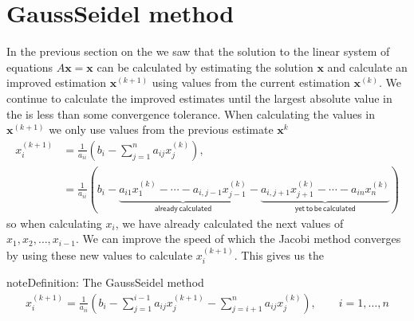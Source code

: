 \documentclass[letterpaper,10pt,english]{jupyterBook}
\begin{document}
\section{Gauss\sphinxhyphen{}Seidel method}
\label{\detokenize{7_Indirect_methods/7.2_Gauss_Seidel_method:gauss-seidel-method}}\label{\detokenize{7_Indirect_methods/7.2_Gauss_Seidel_method:gauss-seidel-method-section}}\label{\detokenize{7_Indirect_methods/7.2_Gauss_Seidel_method::doc}}
\sphinxAtStartPar
In the previous section on the {\hyperref[\detokenize{7_Indirect_methods/7.1_Jacobi_method:jacobi-method-section}]{}} we saw that the solution to the linear system of equations \(A \mathbf{x} = \mathbf{x}\) can be calculated by estimating the solution \(\mathbf{x}\) and calculate an improved estimation \(\mathbf{x}^{(k+1)}\) using values from the current estimation \(\mathbf{x}^{(k)}\). We continue to calculate the improved estimates until the largest absolute value in the {\hyperref[\detokenize{7_Indirect_methods/7.1_Jacobi_method:residual-definition}]{}} is less than some convergence tolerance. When calculating the values in \(\mathbf{x}^{(k+1)}\) we only use values from the previous estimate \(\mathbf{x}^{k}\)
\begin{align*}
    x_i^{(k+1)} &= \frac{1}{a_{ii}} \left( b_i - \sum_{j=1}^n a_{ij} x_j^{(k)} \right), \\
    &= \frac{1}{a_{ii}} \left( b_i - \underbrace{a_{i1} x_1^{(k)} - \cdots - a_{i,j-1} x_{j-1}^{(k)}}_{\mathsf{already\,calculated}} - \underbrace{a_{i,j+1} x_{j+1}^{(k)} - \cdots - a_{in} x_n^{(k)}}_{\mathsf{yet\, to\, be\, calculated}} \right)
\end{align*}
\sphinxAtStartPar
so when calculating \(x_i\), we have already calculated the next values of \(x_1, x_2, \ldots, x_{i-1}\). We can improve the speed of which the Jacobi method converges by using these new values to calculate \(x_i^{(k+1)}\). This gives us the 

\begin{sphinxadmonition}{note}{Definition: The Gauss\sphinxhyphen{}Seidel method}
\begin{equation}\label{equation:7_Indirect_methods/7.2_Gauss_Seidel_method:gauss-seidel-method-equation}
\begin{split}x_i^{(k+1)} = \frac{1}{a_{ii} }\left(b_i - \sum_{j=1}^{i-1} a_{ij} x_j^{(k+1)} -\sum_{j=i+1}^n a_{ij} x_j^{(k)} \right), \qquad i=1, \ldots , n\end{split}
\end{equation}\end{sphinxadmonition}
\end{document}
